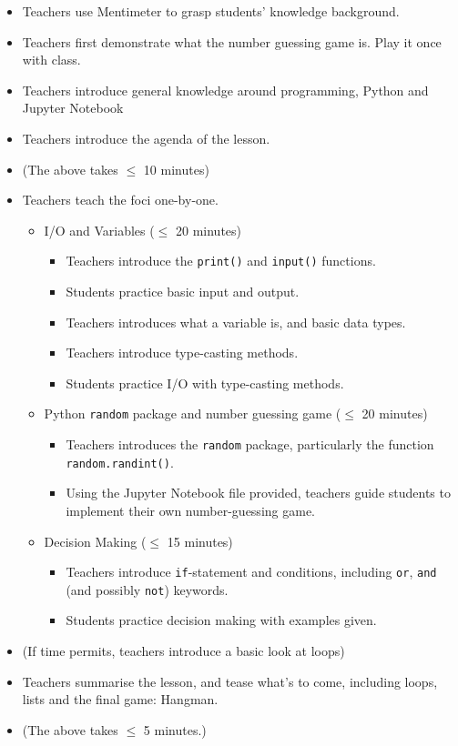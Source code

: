 \documentclass{article}
\def\T{Teachers }
\def\t{teachers }
\def\S{Students }
\def\s{students }
\begin{document}
\begin{itemize}
\item \T use Mentimeter to grasp students' knowledge background.

\item \T first demonstrate what the number guessing game is. Play it once with class.

\item \T introduce general knowledge around programming, Python and Jupyter Notebook

\item \T introduce the agenda of the lesson.

\item[] (The above takes $\leq$ 10 minutes)

\item \T teach the foci one-by-one.
	\begin{itemize}
		\item I/O and Variables ($\leq$ 20 minutes)
		\begin{itemize}
			\item \T introduce the \texttt{print()} and \texttt{input()} functions.
			\item \S practice basic input and output.
			\item \T introduces what a variable is, and basic data types.
			\item \T introduce type-casting methods.
			\item \S practice I/O with type-casting methods.
		\end{itemize}
		\item Python \texttt{random} package and number guessing game ($\leq$ 20 minutes)
		\begin{itemize}
			\item \T introduces the \texttt{random} package, particularly the function \texttt{random.randint()}.
			\item Using the Jupyter Notebook file provided, \t guide \s to implement their own number-guessing game.
		\end{itemize}
		\item Decision Making ($\leq$ 15 minutes)
		\begin{itemize}
			\item \T introduce \texttt{if}-statement and conditions, including \texttt{or}, \texttt{and} (and possibly \texttt{not}) keywords.
			\item \S practice decision making with examples given.
		\end{itemize}
	\end{itemize}

\item (If time permits, \t introduce a basic look at loops)

\item \T summarise the lesson, and tease what's to come, including loops, lists and the final game: Hangman.

\item[] (The above takes $\leq$ 5 minutes.)
\end{itemize} 
\end{document}
